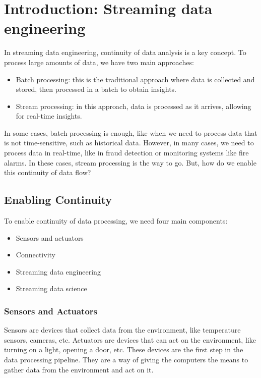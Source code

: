 \chapter{Introduction: Streaming data engineering}

In streaming data engineering, continuity of data analysis is a key concept. To process
large amounts of data, we have two main approaches:

\begin{itemize}
    \item Batch processing: this is the traditional approach where data is collected and stored, 
    then processed in a batch to obtain insights.
    \item Stream processing: in this approach, data is processed as it arrives, allowing for real-time
    insights.
\end{itemize}

In some cases, batch processing is enough, like when we need to process data that is not time-sensitive, such
as historical data. However, in many cases, we need to process data in real-time, like in fraud detection or
monitoring systems like fire alarms. In these cases, stream processing is the way to go. But, how do 
we enable this continuity of data flow?

\section{Enabling Continuity}

To enable continuity of data processing, we need four main components:

\begin{itemize}
    \item Sensors and actuators
    \item Connectivity
    \item Streaming data engineering
    \item Streaming data science
\end{itemize}

\subsection{Sensors and Actuators}

Sensors are devices that collect data from the environment, like temperature sensors, cameras, etc. Actuators
are devices that can act on the environment, like turning on a light, opening a door, etc. These devices
are the first step in the data processing pipeline. They are a way of giving the computers the means to gather 
data from the environment and act on it.\\


